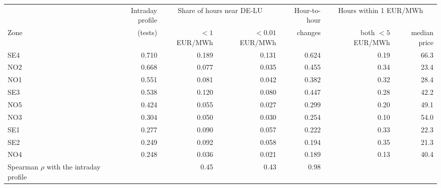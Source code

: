 \begin{tabular}{lrrrrrr}
\toprule
 & Intraday profile & \multicolumn{2}{c}{Share of hours near DE-LU} & Hour-to-hour & \multicolumn{2}{c}{Hours within 1 EUR/MWh} \\
\cmidrule(lr){3-4} \cmidrule(lr){6-7}
Zone & (tests) & $<1$ EUR/MWh & $<0.01$ EUR/MWh & changes & both $<5$ EUR/MWh & median price \\
\midrule
SE4 & 0.710 & 0.189 & 0.131 & 0.624 & 0.19 & 66.3 \\
NO2 & 0.668 & 0.077 & 0.035 & 0.455 & 0.34 & 23.4 \\
NO1 & 0.551 & 0.081 & 0.042 & 0.382 & 0.32 & 28.4 \\
SE3 & 0.538 & 0.120 & 0.080 & 0.447 & 0.28 & 42.2 \\
NO5 & 0.424 & 0.055 & 0.027 & 0.299 & 0.20 & 49.1 \\
NO3 & 0.304 & 0.050 & 0.030 & 0.254 & 0.10 & 54.0 \\
SE1 & 0.277 & 0.090 & 0.057 & 0.222 & 0.33 & 22.3 \\
SE2 & 0.249 & 0.092 & 0.058 & 0.194 & 0.35 & 21.3 \\
NO4 & 0.248 & 0.036 & 0.021 & 0.189 & 0.13 & 40.4 \\
\midrule
Spearman $\rho$ with the intraday profile & & 0.45 & 0.43 & 0.98 & & \\
\bottomrule
\end{tabular}
